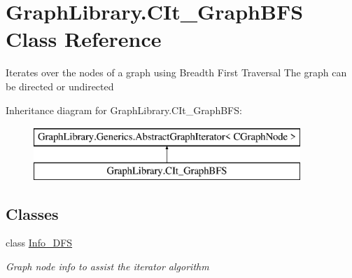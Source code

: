 \hypertarget{class_graph_library_1_1_c_it___graph_b_f_s}{}\section{Graph\+Library.\+C\+It\+\_\+\+Graph\+B\+F\+S Class Reference}
\label{class_graph_library_1_1_c_it___graph_b_f_s}


Iterates over the nodes of a graph using Breadth First Traversal The graph can be directed or undirected  


Inheritance diagram for Graph\+Library.\+C\+It\+\_\+\+Graph\+B\+F\+S\+:\begin{figure}[H]
\begin{center}
\leavevmode
\includegraphics[height=2.000000cm]{class_graph_library_1_1_c_it___graph_b_f_s}
\end{center}
\end{figure}
\subsection*{Classes}
\begin{DoxyCompactItemize}
\item 
class \hyperlink{class_graph_library_1_1_c_it___graph_b_f_s_1_1_info___d_f_s}{Info\+\_\+\+D\+F\+S}
\begin{DoxyCompactList}\small\item\em Graph node info to assist the iterator algorithm \end{DoxyCompactList}\end{DoxyCompactItemize}
